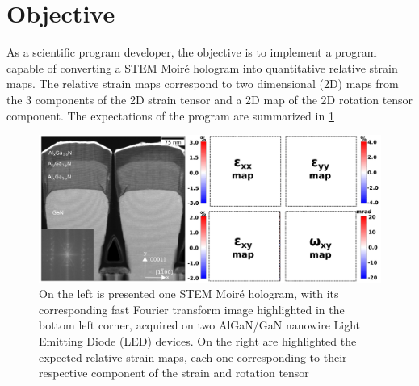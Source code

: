\documentclass{article}
\begin{document}
\section{Objective}
As a scientific program developer, the objective is to implement a program capable of converting a STEM Moir{\'e} hologram into quantitative relative strain maps. The relative strain maps correspond to two dimensional (2D) maps from the 3 components of the 2D strain tensor and a 2D map of the 2D rotation tensor component. The expectations of the program are summarized in \cref{fig:STEM_Moire_GPA_Objective}
\begin{figure}[H]
	\centering
	\includegraphics[width=\linewidth]{Figures/STEM_Moire_GPA_objective.png}
	\caption[STEM Moir{\'e} GPA objective]{On the left is presented one STEM Moir{\'e} hologram, with its corresponding fast Fourier transform image highlighted in the bottom left corner, acquired on two AlGaN/GaN nanowire Light Emitting Diode (LED) devices. On the right are highlighted the expected relative strain maps, each one corresponding to their respective component of the strain and rotation tensor}
	\label{fig:STEM_Moire_GPA_Objective}
\end{figure}
\end{document}
